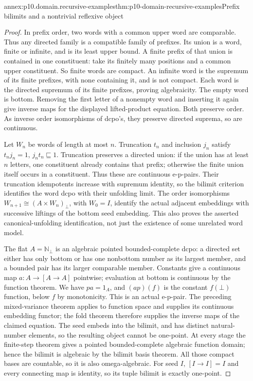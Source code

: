 \begin{annexitem}{annex:p10.domain.recursive-examples}{thm:p10-domain-recursive-examples}{Prefix bilimits and a nontrivial reflexive object}
\begin{proof}
In prefix order, two words with a common upper word are comparable.
Thus any directed family is a compatible family of prefixes. Its
union is a word, finite or infinite, and is its least upper bound.
A finite prefix of that union is contained in one constituent:
take its finitely many positions and a common upper constituent.
So finite words are compact. An infinite word is the supremum
of its finite prefixes, with none containing it, and is not compact.
Each word is the directed supremum of its finite prefixes, proving
algebraicity. The empty word is bottom.
Removing the first letter of a nonempty word and inserting it
again give inverse maps for the displayed lifted-product equation.
Both preserve order. As inverse order isomorphisms of dcpo's,
they preserve directed suprema, so are continuous.

Let \(W_n\) be words of length at most \(n\). Truncation
\(t_n\) and inclusion \(j_n\) satisfy
\(t_nj_n=1\), \(j_nt_n\sqsubseteq1\).
Truncation preserves a directed union: if the union has at least
\(n\) letters, one constituent already contains that prefix;
otherwise the finite union itself occurs in a constituent.
Thus these are continuous e-p-pairs.
Their truncation idempotents increase with supremum identity,
so the bilimit criterion identifies the word dcpo with their
unfolding limit. The order isomorphisms
\(W_{n+1}\cong(A\times W_n)_{\bot}\), with \(W_0=I\),
identify the actual adjacent embeddings with successive liftings
of the bottom seed embedding. This also proves the asserted
canonical-unfolding identification, not just the existence of
some unrelated word model.

The flat \(A=\mathbb N_{\bot}\) is an algebraic pointed
bounded-complete dcpo: a directed set either has only bottom or
has one nonbottom number as its largest member, and a bounded
pair has its larger comparable member. Constants give a continuous
map \(a:A\to[A\longrightarrow A]\) pointwise; evaluation at
bottom is continuous by the function theorem. We have
\(pa=1_A\), and \((ap)(f)\) is the constant \(f(\bot)\)
function, below \(f\) by monotonicity. This is an actual e-p-pair.
The preceding mixed-variance theorem applies to function space
and supplies its continuous embedding functor; the fold theorem
therefore supplies the inverse maps of the claimed equation.
The seed embeds into the bilimit, and has distinct natural-number
elements, so the resulting object cannot be one-point. At every
stage the finite-step theorem gives a pointed bounded-complete
algebraic function domain; hence the bilimit is algebraic by
the bilimit basis theorem. All those compact bases are countable,
so it is also omega-algebraic.
For seed \(I\), \([I\longrightarrow I]=I\) and every connecting
map is identity, so its tuple bilimit is exactly one-point.


\end{proof}
\end{annexitem}
